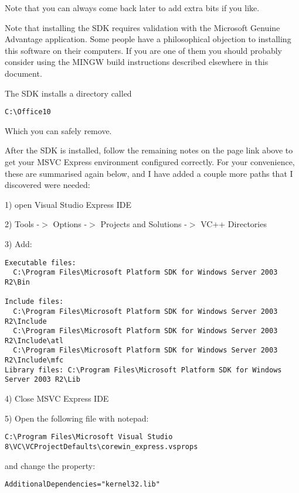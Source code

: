 Note that you can always come back later to add extra bits if you like.

Note that installing the SDK requires validation with the 
Microsoft Genuine Advantage application. Some people have a philosophical 
objection to installing this software on their computers. If you are one 
of them you should probably consider using the MINGW build instructions 
described elsewhere in this document.

The SDK installs a directory called

\begin{verbatim}
C:\Office10
\end{verbatim}

Which you can safely remove.

After the SDK is installed, follow the remaining notes on the page link 
above to get your MSVC Express environment configured correctly. For your 
convenience, these are summarised again below, and I have added a couple 
more paths that I discovered were needed:

1) open Visual Studio Express IDE

2) Tools -$>$ Options -$>$ Projects and Solutions -$>$ VC++ Directories

3) Add:

\begin{verbatim}
Executable files: 
  C:\Program Files\Microsoft Platform SDK for Windows Server 2003 R2\Bin

Include files: 
  C:\Program Files\Microsoft Platform SDK for Windows Server 2003 R2\Include
  C:\Program Files\Microsoft Platform SDK for Windows Server 2003 R2\Include\atl
  C:\Program Files\Microsoft Platform SDK for Windows Server 2003 R2\Include\mfc
Library files: C:\Program Files\Microsoft Platform SDK for Windows Server 2003 R2\Lib
\end{verbatim}

4) Close MSVC Express IDE

5) Open the following file with notepad:

\begin{verbatim}
C:\Program Files\Microsoft Visual Studio 8\VC\VCProjectDefaults\corewin_express.vsprops
\end{verbatim}

and change the property:

\begin{verbatim}
AdditionalDependencies="kernel32.lib"
\end{verbatim}

